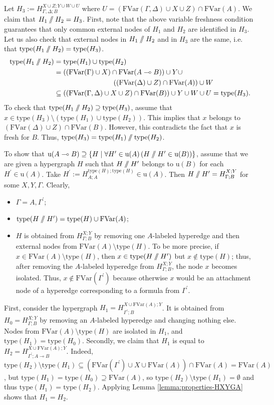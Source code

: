 \documentclass[a4paper,UKenglish,cleveref, autoref, thm-restate,pdfa]{lipics-v2021}
\newcommand{\eqdef}{:=}
\newcommand{\type}{\mathrm{type}}
\newcommand{\FVar}{\mathrm{FVar}}
\newcommand{\limpl}{\multimap}
\newcommand{\pc}{\mathbin{/\mkern-6mu/}}
\begin{document}
Let $H_3 \eqdef H_{\Gamma , \Delta; B}^{X \cup Z ; Y \cup W \cup U}$ where $U = (\FVar(\Gamma, \Delta) \cup X \cup Z) \cap \FVar(A)$. We claim that $H_1 \pc H_2 = H_3$. First, note that the above variable freshness condition guarantees that only common external nodes of $H_1$ and $H_2$ are identified in $H_3$. Let us also check that external nodes in $H_1\pc H_2$ and in $H_3$ are the same, i.e. that $\type(H_1 \pc H_2) = \type(H_3)$. 
\begin{align*}
	\type(H_1 \pc H_2) &= \type(H_1) \cup \type(H_2) 
	\\
	& = ((\FVar(\Gamma) \cup X) \cap \FVar(A \limpl B)) \cup Y \cup
	\\ & \hspace{3cm} ((\FVar(\Delta) \cup Z) \cap \FVar(A)) \cup W
	\\
	& \subseteq
	((\FVar(\Gamma , \Delta) \cup X \cup Z) \cap \FVar(B)) \cup Y \cup W \cup U = \type(H_3).
\end{align*}
To check that $\type(H_1 \pc H_2) \supseteq \type(H_3)$, assume that $x \in \type(H_3) \setminus (\type(H_1) \cup \type(H_2))$. This implies that $x$ belongs to $(\FVar(\Delta) \cup Z) \cap \FVar(B)$. However, this contradicts the fact that $x$ is fresh for $B$. Thus, $\type(H_3) = \type(H_1) \pc \type(H_2)$.

To show that $\mathrm{u}(A \limpl B) \supseteq \{H \mid \forall H^\prime \in \mathrm{u}(A) \, (H \pc H^\prime \in \mathrm{u}(B))\}$, assume that we are given a hypergraph $H$ such that $H \pc H^\prime$ belongs to $\mathrm{u}(B)$ for each $H^\prime \in \mathrm{u}(A)$. Take $H^\prime \eqdef H^{\type(H);\type(H)}_{A;A} \in \mathrm{u}(A)$. Then $H \pc H^\prime = H^{X;Y}_{\Gamma;B}$ for some $X,Y,\Gamma$. Clearly,
\begin{itemize}
	\item $\Gamma = A, \Gamma^\prime$;
	\item $\type(H \pc H^\prime) = \type(H) \cup \FVar(A)$;
	\item $H$ is obtained from $H^{X;Y}_{\Gamma;B}$ by removing one $A$-labeled hyperedge and then external nodes from $\FVar(A) \setminus \type(H)$. To be more precise, if $x\in \FVar(A) \setminus \type(H)$, then $x \in \type(H \pc H^\prime)$ but $x \notin \type(H)$; thus, after removing the $A$-labeled hyperedge from $H^{X;Y}_{\Gamma;B}$, the node $x$ becomes isolated. Thus, $x \notin \FVar(\Gamma^\prime)$ because otherwise $x$ would be an attachment node of a hyperedge corresponding to a formula from $\Gamma^\prime$.
\end{itemize}
First, consider the hypergraph $H_1 = H^{X\cup\FVar(A);Y}_{\Gamma^\prime;B}$. It is obtained from $H_0 = H^{X;Y}_{\Gamma;B}$ by removing an $A$-labeled hyperedge and changing nothing else. Nodes from $\FVar(A) \setminus \type(H)$ are isolated in $H_1$, and $\type(H_1) = \type(H_0)$. Secondly, we claim that $H_1$ is equal to $H_2 = H^{X \cup \FVar(A);Y}_{\Gamma^\prime;A \limpl B}$. Indeed, $\type(H_2) \setminus \type(H_1) \subseteq (\FVar(\Gamma^\prime) \cup X \cup \FVar(A)) \cap \FVar(A) = \FVar(A)$, but $\type(H_1) = \type(H_0)\supseteq \FVar(A)$, so $\type(H_2) \setminus \type(H_1) = \emptyset$ and thus $\type(H_1) = \type(H_2)$. Applying Lemma \ref{lemma:properties-HXYGA} shows that $H_1=H_2$.
\end{document}
